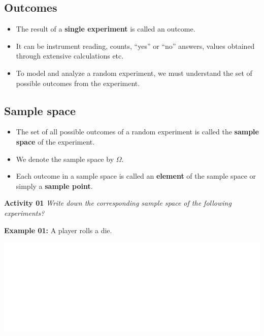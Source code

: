 \documentclass[]{book}
\providecommand{\tightlist}{%
  \setlength{\itemsep}{0pt}\setlength{\parskip}{0pt}}
\begin{document}
\hypertarget{outcomes}{%
\subsection{Outcomes}\label{outcomes}}

\begin{itemize}
\tightlist
\item
  The result of a \textbf{single experiment} is called an outcome.
\item
  It can be instrument reading, counts, ``yes'' or ``no'' answers, values obtained through extensive calculations etc.
\item
  To model and analyze a random experiment, we must understand the set of possible outcomes from the experiment.
\end{itemize}

\hypertarget{sample-space}{%
\subsection{Sample space}\label{sample-space}}

\begin{itemize}
\tightlist
\item
  The set of all possible outcomes of a random experiment is called the \textbf{sample space} of the experiment.
\item
  We denote the sample space by \(\Omega\).
\item
  Each outcome in a sample space is called an \textbf{element} of the sample space or simply a \textbf{sample point}.
\end{itemize}

\textbf{Activity 01}
\emph{Write down the corresponding sample space of the following experiments?}

\textbf{Example 01:} A player rolls a die.

\begin{center}\includegraphics[width=1\linewidth]{figure/box71a-1} \end{center}
\end{document}
